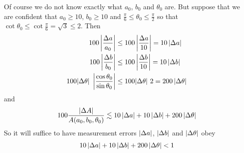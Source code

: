 \begin{eg}
Of course we do not know exactly what $a_0$, $b_0$ and $\theta_0$ are.
But suppose that we are confident that $a_0\ge 10$, $b_0\ge 10$
and $\frac{\pi}{6}\le \theta_0 \le \frac{\pi}{2}$ so that 
$\cot\theta_0\le \cot\frac{\pi}{6}=\sqrt{3}\le 2$. Then 
\begin{align*}
100\left|\frac{\Delta a}{a_0}\right|&\le 100\left|\frac{\Delta a}{10}\right|
                                 = 10\,|\Delta a| \\
 100\left|\frac{\Delta b}{b_0} \right|&\le  100\left|\frac{\Delta b}{10} \right|
                                = 10\,|\Delta b| \\
100|\Delta\theta|\ \left|\frac{\cos\theta_0}{\sin\theta_0} \right|
       &\le 100|\Delta\theta|\ 2 
       =200\,|\Delta\theta|
\end{align*}
and
\begin{align*}
100\frac{|\Delta A|}{A(a_0,b_0,\theta_0)}
\lesssim 10\,|\Delta a| + 10\,|\Delta b| +200\,|\Delta\theta|
\end{align*} 
So it will suffice to have
measurement errors $|\Delta a|$, $|\Delta b|$ and $|\Delta\theta|$ obey
\begin{equation*}
10\,|\Delta a| + 10\,|\Delta b| +200\,|\Delta\theta|<1
\end{equation*}
\end{eg}
\goodbreak





